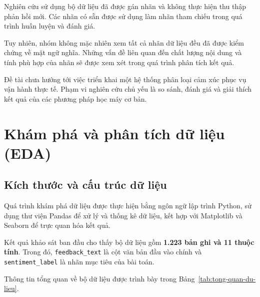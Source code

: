 Nghiên cứu sử dụng bộ dữ liệu đã được gán nhãn và không thực hiện thu thập phản hồi mới. Các nhãn có sẵn được sử dụng làm nhãn tham chiếu trong quá trình huấn luyện và đánh giá.

Tuy nhiên, nhóm không mặc nhiên xem tất cả nhãn dữ liệu đều đã được kiểm chứng về mặt ngữ nghĩa. Những vấn đề liên quan đến chất lượng nội dung và tính phù hợp của nhãn sẽ được xem xét trong quá trình phân tích kết quả.

Đề tài chưa hướng tới việc triển khai một hệ thống phân loại cảm xúc phục vụ vận hành thực tế. Phạm vi nghiên cứu chủ yếu là so sánh, đánh giá và giải thích kết quả của các phương pháp học máy cơ bản.



\section{Khám phá và phân tích dữ liệu (EDA)}

\subsection{Kích thước và cấu trúc dữ liệu}

Quá trình khám phá dữ liệu được thực hiện bằng ngôn ngữ lập trình Python, sử dụng thư viện Pandas để xử lý và thống kê dữ liệu, kết hợp với Matplotlib và Seaborn để trực quan hóa kết quả.

Kết quả khảo sát ban đầu cho thấy bộ dữ liệu gồm \textbf{1.223 bản ghi và 11 thuộc tính}. Trong đó, \texttt{feedback\_text} là cột văn bản đầu vào chính và \texttt{sentiment\_label} là nhãn mục tiêu của bài toán.

Thông tin tổng quan về bộ dữ liệu được trình bày trong Bảng~\ref{tab:tong-quan-du-lieu}.

